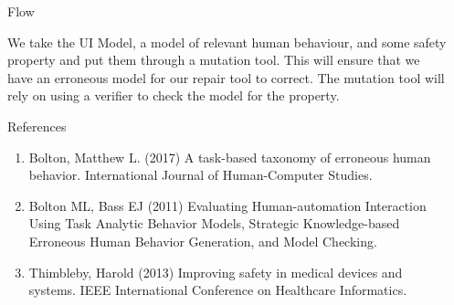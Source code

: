 \documentclass[final,20pt]{beamer}
\newlength{\twocolwid}
\newlength{\specialA}
\newlength{\specialB}
\begin{document}
\begin{frame}[t]
\begin{columns}[t]
\begin{column}{\twocolwid}
\begin{columns}[t,totalwidth=\twocolwid]
\begin{column}{\specialA}
\begin{block}{\Large Flow}
\begin{center}
\end{center}
\large We take the UI Model, a model of relevant human behaviour, and some safety property and put them through a mutation tool.  This will ensure that we have an erroneous model for our repair tool to correct.  The mutation tool will rely on using a verifier to check the model for the property.
\end{block}

\begin{block}{\normalsize References}
\begin{enumerate}[1 ]
    \item \normalsize Bolton, Matthew L. (2017) A task-based taxonomy of erroneous human behavior. International Journal of Human-Computer Studies.
    \item \normalsize Bolton ML, Bass EJ (2011) Evaluating Human-automation Interaction Using Task Analytic Behavior Models, Strategic Knowledge-based Erroneous Human Behavior Generation, and Model Checking.
    \item \normalsize Thimbleby, Harold (2013) Improving safety in medical devices and systems.  IEEE International Conference on Healthcare Informatics.
\end{enumerate}
\end{block}

\end{column} %

\begin{column}{\specialB}\vspace{-2cm} %


\end{column}
\end{columns}
\end{column}
\end{columns}
\end{frame}
\end{document}
